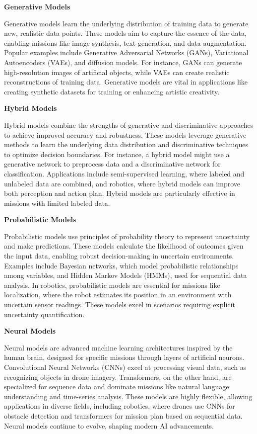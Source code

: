 \documentclass{book}
\providecommand{\ProjectDeepHeading}[2]{%
    \par\medskip\noindent\textbf{#2}\par\smallskip
}
\begin{document}
\ProjectDeepHeading{3}{Generative Models}
Generative models learn the underlying distribution of training data to generate new, realistic data points. These models aim to capture the essence of the data, enabling missions like image synthesis, text generation, and data augmentation. Popular examples include Generative Adversarial Networks (GANs), Variational Autoencoders (VAEs), and diffusion models. For instance, GANs can generate high-resolution images of artificial objects, while VAEs can create realistic reconstructions of training data. Generative models are vital in applications like creating synthetic datasets for training or enhancing artistic creativity.



\ProjectDeepHeading{3}{Hybrid Models}
Hybrid models combine the strengths of generative and discriminative approaches to achieve improved accuracy and robustness. These models leverage generative methods to learn the underlying data distribution and discriminative techniques to optimize decision boundaries. For instance, a hybrid model might use a generative network to preprocess data and a discriminative network for classification. Applications include semi-supervised learning, where labeled and unlabeled data are combined, and robotics, where hybrid models can improve both perception and action plan. Hybrid models are particularly effective in missions with limited labeled data.

\ProjectDeepHeading{3}{Probabilistic Models}
Probabilistic models use principles of probability theory to represent uncertainty and make predictions. These models calculate the likelihood of outcomes given the input data, enabling robust decision-making in uncertain environments. Examples include Bayesian networks, which model probabilistic relationships among variables, and Hidden Markov Models (HMMs), used for sequential data analysis. In robotics, probabilistic models are essential for missions like localization, where the robot estimates its position in an environment with uncertain sensor readings. These models excel in scenarios requiring explicit uncertainty quantification.

\ProjectDeepHeading{3}{Neural Models}
Neural models are advanced machine learning architectures inspired by the human brain, designed for specific missions through layers of artificial neurons. Convolutional Neural Networks (CNNs) excel at processing visual data, such as recognizing objects in drone imagery. Transformers, on the other hand, are specialized for sequence data and dominate missions like natural language understanding and time-series analysis. These models are highly flexible, allowing applications in diverse fields, including robotics, where drones use CNNs for obstacle detection and transformers for mission plan based on sequential data. Neural models continue to evolve, shaping modern AI advancements.
\end{document}
